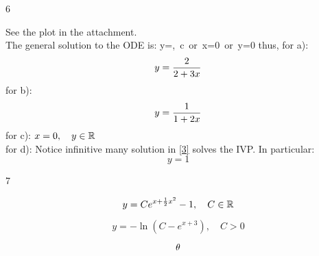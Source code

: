 \begin{vv286_ms}{6}
\item[]
See the plot in the attachment.\\
The general solution to the ODE is:
\eq
{
y=,\, c\in\R\quad\hbox{ or }\quad x=0\hbox{ or }y=0
}
thus, for a):
\[
y=\frac{2}{2+3x}
\]
for b):
\[
y=\frac{1}{1+2x}
\]
for c): $x=0,\quad y\in\mathbb{R}$\\
for d): Notice infinitive many solution in \eqref{3} solves the IVP. In
particular:
\[
y=1
\]
\end{vv286_ms}


\begin{vv286_ms}{7}
\item[(a)]
\[
y=Ce^{x+\frac{1}{2}x^2}-1,\quad C\in\mathbb{R}
\]
\item[(b)]
 \[
 y=-\ln (C-e^{x+3}),\quad C>0
 \]
\end{vv286_ms}


\[
\def\ta{\theta}
\ta
\]


